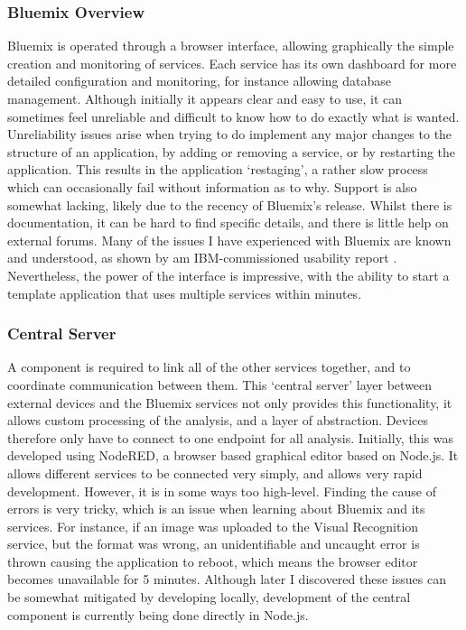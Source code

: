 \documentclass{article}
\begin{document}
\subsubsection{Bluemix Overview}
Bluemix is operated through a browser interface, allowing graphically the simple creation and monitoring of services. Each service has its own dashboard for more detailed configuration and monitoring, for instance allowing database management. Although initially it appears clear and easy to use, it can sometimes feel unreliable and difficult to know how to do exactly what is wanted. Unreliability issues arise when trying to do implement any major changes to the structure of an application, by adding or removing a service, or by restarting the application. This results in the application `restaging', a rather slow process which can occasionally fail without information as to why. Support is also somewhat lacking, likely due to the recency of Bluemix's release. Whilst there is documentation, it can be hard to find specific details, and there is little help on external forums. Many of the issues I have experienced with Bluemix are known and understood, as shown by am IBM-commissioned usability report \cite{Bluemix}. Nevertheless, the power of the interface is impressive, with the ability to start a template application that uses multiple services within minutes.

\subsubsection{Central Server}
A component is required to link all of the other services together, and to coordinate communication between them. This `central server' layer between external devices and the Bluemix services not only provides this functionality, it allows custom processing of the analysis, and a layer of abstraction. Devices therefore only have to connect to one endpoint for all analysis. Initially, this was developed using NodeRED, a browser based graphical editor based on Node.js. It allows different services to be connected very simply, and allows very rapid development. However, it is in some ways too high-level. Finding the cause of errors is very tricky, which is an issue when learning about Bluemix and its services. For instance, if an image was uploaded to the Visual Recognition service, but the format was wrong, an unidentifiable and uncaught error is thrown causing the application to reboot, which means the browser editor becomes unavailable for 5 minutes. Although later I discovered these issues can be somewhat mitigated by developing locally, development of the central component is currently being done directly in Node.js.
\end{document}
